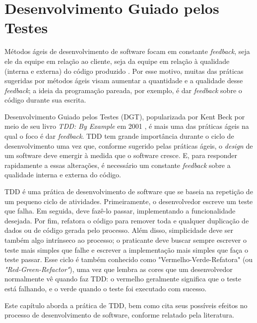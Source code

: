\chapter{Desenvolvimento Guiado pelos Testes}
\label{cap:tdd}

Métodos ágeis de desenvolvimento de software focam em constante
\textit{feedback}, seja ele da equipe em relação ao cliente, seja da equipe em relação à
qualidade (interna e externa) do código produzido \cite{AgileManifesto}. Por
esse motivo, muitas das práticas sugeridas por métodos ágeis visam aumentar a 
quantidade e a qualidade desse \textit{feedback}; a ideia da programação pareada, por
exemplo, é dar \textit{feedback} sobre o código durante sua escrita.

Desenvolvimento Guiado pelos Testes (DGT), popularizada por Kent Beck por meio de seu livro
\textit{TDD: By Example} em 2001 \cite{TDDByExample}, é mais uma das práticas
ágeis na qual o foco é dar \textit{feedback}. TDD tem grande importância durante o ciclo
de desenvolvimento uma vez que, conforme sugerido pelas práticas ágeis, o \textit{design} de um
software deve emergir à medida que o software cresce. E, para responder
rapidamente a essas alterações, é necessário um constante \textit{feedback} sobre a
qualidade interna e externa do código.

TDD é uma prática de desenvolvimento de software que se baseia na repetição de
um pequeno ciclo de atividades. Primeiramente, o desenvolvedor escreve um
teste que falha. Em seguida, deve fazê-lo passar, implementando a
funcionalidade desejada. Por fim, refatora o código para remover toda e qualquer
duplicação de dados ou de código gerada pelo processo.
Além disso, simplicidade deve ser também algo intrínseco ao processo; o praticante
deve buscar sempre escrever o teste mais simples que falhe e escrever a implementação mais simples
que faça o teste passar.
Esse ciclo
é também conhecido como 
"Vermelho-Verde-Refatora" (ou \textit{"Red-Green-Refactor"}), uma vez que lembra as cores que um 
desenvolvedor normalmente vê quando faz TDD: o vermelho geralmente significa que
o teste está falhando, e o verde quando o teste foi executado com sucesso.

Este capítulo aborda a prática de TDD, bem como cita
seus possíveis efeitos no processo de desenvolvimento de software, conforme relatado pela
literatura.

